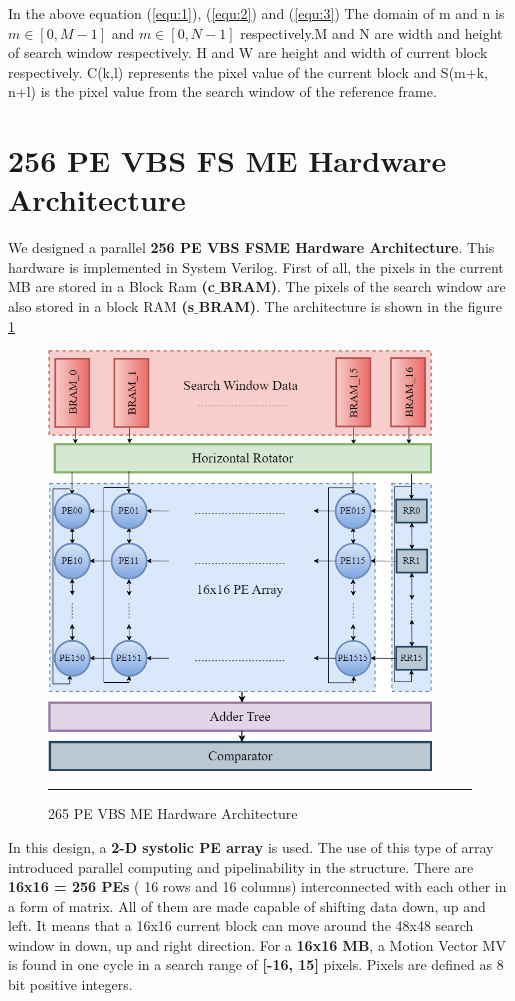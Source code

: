 In the above equation (\ref{equ:1}), (\ref{equ:2}) and (\ref{equ:3}) The domain of m and n is $m \in [0, M-1] $ and $m \in [0, N-1]$ respectively.M and N are width and height of search window respectively. H and W are height and width of current block respectively. C(k,l) represents the pixel value of the current block and S(m+k, n+l) is the pixel value from the search window of the reference frame.\cite{li2003serial} \\

\section{256 PE VBS FS ME Hardware Architecture}
We designed a parallel \textbf{256 PE VBS FSME Hardware Architecture}. \cite{kalaycioglu2011low} This hardware is implemented in System Verilog. First of all, the pixels in the current MB are stored in a Block Ram \textbf{(c$\_$BRAM)}. The pixels of the search window are also stored in a block RAM \textbf{(s$\_$BRAM)}. The architecture is shown in the figure \ref{fig:256pevbsme}

\begin{figure}[htbp]
	\centering
	\includegraphics[width = 4in]{./Figures/256pevbsme.png}
	\rule{35em}{0.5pt}
	\caption{265 PE VBS ME Hardware Architecture}
	\label{fig:256pevbsme}
\end{figure}

In this design, a \textbf{2-D systolic PE array} is used. The use of this type of array introduced parallel computing and pipelinability in the structure. There are \textbf{16x16 = 256 PEs} ( 16 rows and 16 columns) interconnected with each other in a form of matrix. All of them are  made capable of shifting data down, up and left. It means that a 16x16 current block can move around the 48x48 search window in down, up and right direction. For a \textbf{16x16 MB}, a Motion Vector MV is found in one cycle in a search range of \textbf{[-16, 15]} pixels. Pixels are defined as 8 bit positive integers.

